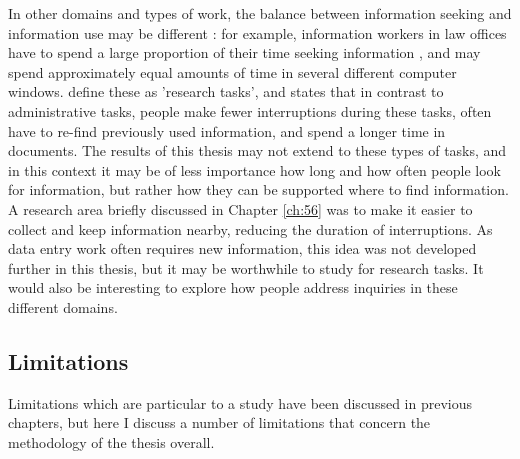 In other domains and types of work, the balance between information seeking and information use may be different \citep{Bondarenko2005}: for example, information workers in law offices have to spend a large proportion of their time seeking information \citep{Cangiano2009}, and may spend approximately equal amounts of time in several different computer windows. \citet{Bondarenko2005} define these as 'research tasks', and states that in contrast to administrative tasks, people make fewer interruptions during these tasks, often have to re-find previously used information, and spend a longer time in documents. The results of this thesis may not extend to these types of tasks, and in this context it may be of less importance how long and how often people look for information, but rather how they can be supported where to find information. A research area briefly discussed in Chapter \ref{ch:56} was to make it easier to collect and keep information nearby, reducing the duration of interruptions. As data entry work often requires new information, this idea was not developed further in this thesis, but it may be worthwhile to study for research tasks. It would also be interesting to explore how people address inquiries in these different domains. 


\subsection{Limitations}
Limitations which are particular to a study have been discussed in previous chapters, but here I discuss a number of limitations that concern the methodology of the thesis overall. 

